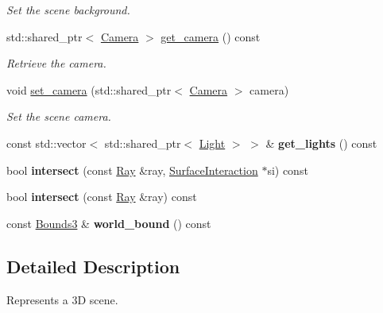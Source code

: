 \begin{DoxyCompactItemize}
\begin{DoxyCompactList}\small\item\em Set the scene background. \end{DoxyCompactList}\item 
std\+::shared\+\_\+ptr$<$ \mbox{\hyperlink{classomg_1_1_camera}{Camera}} $>$ \mbox{\hyperlink{classomg_1_1_scene_a7f9aac9cd9ea4d984ac2df98ae553967}{get\+\_\+camera}} () const
\begin{DoxyCompactList}\small\item\em Retrieve the camera. \end{DoxyCompactList}\item 
void \mbox{\hyperlink{classomg_1_1_scene_a07875fddcc199bc2f70b1c20fd294af4}{set\+\_\+camera}} (std\+::shared\+\_\+ptr$<$ \mbox{\hyperlink{classomg_1_1_camera}{Camera}} $>$ camera)
\begin{DoxyCompactList}\small\item\em Set the scene camera. \end{DoxyCompactList}\item 
\mbox{\label{classomg_1_1_scene_a298107557a29d0ad43908978ee6ff353}} 
const std\+::vector$<$ std\+::shared\+\_\+ptr$<$ \mbox{\hyperlink{classomg_1_1_light}{Light}} $>$ $>$ \& {\bfseries get\+\_\+lights} () const
\item 
\mbox{\label{classomg_1_1_scene_adcf48963a0622d97b8847797fb243cae}} 
bool {\bfseries intersect} (const \mbox{\hyperlink{classomg_1_1_ray}{Ray}} \&ray, \mbox{\hyperlink{classomg_1_1_surface_interaction}{Surface\+Interaction}} $\ast$si) const
\item 
\mbox{\label{classomg_1_1_scene_a8ff0a10b9315ae3b2b8affae5b04b374}} 
bool {\bfseries intersect} (const \mbox{\hyperlink{classomg_1_1_ray}{Ray}} \&ray) const
\item 
\mbox{\label{classomg_1_1_scene_ad11da2d52099b120ece997dab3737570}} 
const \mbox{\hyperlink{classomg_1_1_bounds3}{Bounds3}} \& {\bfseries world\+\_\+bound} () const
\end{DoxyCompactItemize}


\subsection{Detailed Description}
Represents a 3D scene. 

